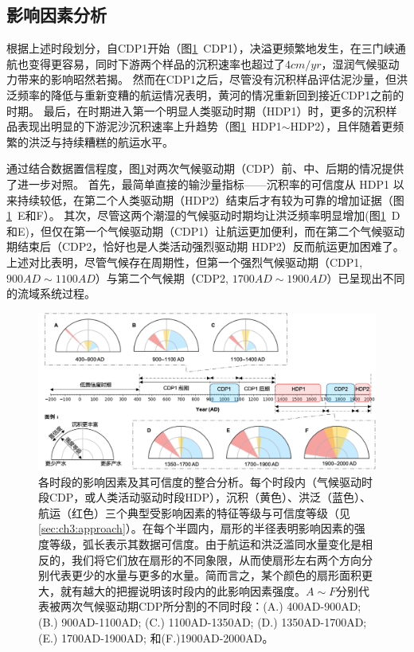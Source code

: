 \subsection{影响因素分析}

根据上述时段划分，自CDP1开始（图\ref{fig:ch3:impacts}~CDP1），决溢更频繁地发生，在三门峡通航也变得更容易，同时下游两个样品的沉积速率也超过了$4cm/yr$，湿润气候驱动力带来的影响昭然若揭。
然而在CDP1之后，尽管没有沉积样品评估泥沙量，但洪泛频率的降低与重新变糟的航运情况表明，黄河的情况重新回到接近CDP1之前的时期。
最后，在时期进入第一个明显人类驱动时期（HDP1）时，更多的沉积样品表现出明显的下游泥沙沉积速率上升趋势（图\ref{fig:ch3:impacts}~HDP1$\sim$HDP2），且伴随着更频繁的洪泛与持续糟糕的航运水平。


通过结合数据置信程度，图\ref{fig:ch3:impacts}对两次气候驱动期（CDP）前、中、后期的情况提供了进一步对照。
首先，最简单直接的输沙量指标——沉积率的可信度从 HDP1 以来持续较低，在第二个人类驱动期（HDP2）结束后才有较为可靠的增加证据（图\ref{fig:ch3:impacts}~E和F）。
其次，尽管这两个潮湿的气候驱动时期均让洪泛频率明显增加(图\ref{fig:ch3:impacts}~D和E)，但仅在第一个气候驱动期（CDP1）让航运更加便利，而在第二个气候驱动期结束后（CDP2，恰好也是人类活动强烈驱动期 HDP2）反而航运更加困难了。
上述对比表明，尽管气候存在周期性，但第一个强烈气候驱动期（CDP1, $900AD\sim1100AD$）与第二个气候期（CDP2, $1700AD\sim1900AD$）已呈现出不同的流域系统过程。

\begin{figure}[htb] %
    \includegraphics[width=\textwidth]{img/ch3/ch3_impacts.png}
    \caption[各时段的影响因素及其可信度的整合分析。]{各时段的影响因素及其可信度的整合分析。每个时段内（气候驱动时段CDP，或人类活动驱动时段HDP），沉积（黄色）、洪泛（蓝色）、航运（红色）三个典型受影响因素的特征等级与可信度等级（见\ref{sec:ch3:approach}）。在每个半圆内，扇形的半径表明影响因素的强度等级，弧长表示其数据可信度。由于航运和洪泛滥同水量变化是相反的，我们将它们放在扇形的不同象限，从而使扇形左右两个方向分别代表更少的水量与更多的水量。简而言之，某个颜色的扇形面积更大，就有越大的把握说明该时段内的此影响因素强度。$A \sim F$分别代表被两次气候驱动期CDP所分割的不同时段：(A.) 400AD-900AD; (B.) 900AD-1100AD; (C.) 1100AD-1350AD; (D.) 1350AD-1700AD; (E.) 1700AD-1900AD; 和(F.)1900AD-2000AD。}
    \label{fig:ch3:impacts}
\end{figure}

